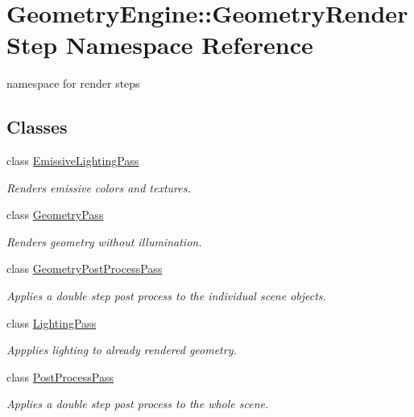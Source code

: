 \hypertarget{namespace_geometry_engine_1_1_geometry_render_step}{}\section{Geometry\+Engine\+::Geometry\+Render\+Step Namespace Reference}
\label{namespace_geometry_engine_1_1_geometry_render_step}


namespace for render steps  


\subsection*{Classes}
\begin{DoxyCompactItemize}
\item 
class \mbox{\hyperlink{class_geometry_engine_1_1_geometry_render_step_1_1_emissive_lighting_pass}{Emissive\+Lighting\+Pass}}
\begin{DoxyCompactList}\small\item\em Renders emissive colors and textures. \end{DoxyCompactList}\item 
class \mbox{\hyperlink{class_geometry_engine_1_1_geometry_render_step_1_1_geometry_pass}{Geometry\+Pass}}
\begin{DoxyCompactList}\small\item\em Renders geometry without illumination. \end{DoxyCompactList}\item 
class \mbox{\hyperlink{class_geometry_engine_1_1_geometry_render_step_1_1_geometry_post_process_pass}{Geometry\+Post\+Process\+Pass}}
\begin{DoxyCompactList}\small\item\em Applies a double step post process to the individual scene objects. \end{DoxyCompactList}\item 
class \mbox{\hyperlink{class_geometry_engine_1_1_geometry_render_step_1_1_lighting_pass}{Lighting\+Pass}}
\begin{DoxyCompactList}\small\item\em Appplies lighting to already rendered geometry. \end{DoxyCompactList}\item 
class \mbox{\hyperlink{class_geometry_engine_1_1_geometry_render_step_1_1_post_process_pass}{Post\+Process\+Pass}}
\begin{DoxyCompactList}\small\item\em Applies a double step post process to the whole scene. \end{DoxyCompactList}\item 

\end{DoxyCompactItemize}
